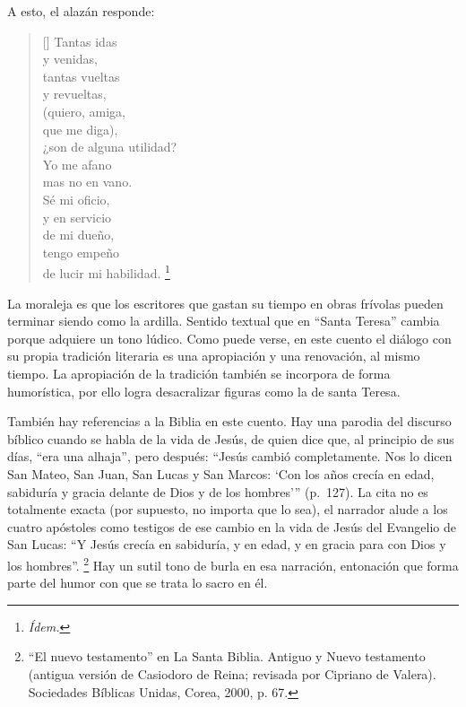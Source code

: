 \documentclass[14pt,twoside,final]{extbook} %
\let\oldfootnote\footnote
\renewcommand\footnote[1]{%
\oldfootnote{\hspace{1mm}#1}}
\begin{document}
A esto, el alazán responde:
\settowidth{\versewidth}{¿son de alguna utilidad?}
\begin{verse}[\versewidth]
Tantas idas \\
y venidas, \\
tantas vueltas \\
y revueltas, \\
(quiero, amiga, \\
que me diga), \\
¿son de alguna utilidad? \\
Yo me afano \\
mas no en vano. \\
Sé mi oficio, \\
y en servicio \\
de mi dueño, \\
tengo empeño \\
de lucir mi habilidad.\footnote{\em Ídem.}
\end{verse}
La moraleja es que los escritores que gastan su tiempo en obras frívolas pueden terminar siendo como la ardilla. Sentido textual que en ``Santa Teresa'' cambia porque adquiere un tono lúdico. Como puede verse, en este cuento el diálogo con su propia tradición literaria es una apropiación y una renovación, al mismo tiempo. La apropiación de la tradición también se incorpora de forma humorística, por ello logra desacralizar figuras como la de santa Teresa.

También hay referencias a la Biblia en este cuento. Hay una parodia del discurso bíblico cuando se habla de la vida de Jesús, de quien dice que, al principio de sus días, ``era una alhaja'', pero después: ``Jesús cambió completamente. Nos lo dicen San Mateo, San Juan, San Lucas y San Marcos: `Con los años crecía en edad, sabiduría y gracia delante de Dios y de los hombres'{}'' (p.~127). La cita no es totalmente exacta (por supuesto, no importa que lo sea), el narrador alude a los cuatro apóstoles como testigos de ese cambio en la vida de Jesús del Evangelio de San Lucas: ``Y Jesús crecía en sabiduría, y en edad, y en gracia para con Dios y los hombres''.\footnote{``El nuevo testamento'' en La Santa Biblia. Antiguo y Nuevo testamento (antigua versión de Casiodoro de Reina; revisada por Cipriano de Valera). Sociedades Bíblicas Unidas, Corea, 2000, p. 67.} Hay un sutil tono de burla en esa narración, entonación que forma parte del humor con que se trata lo sacro en él.\protect\enlargethispage*{\baselineskip}
\end{document}
